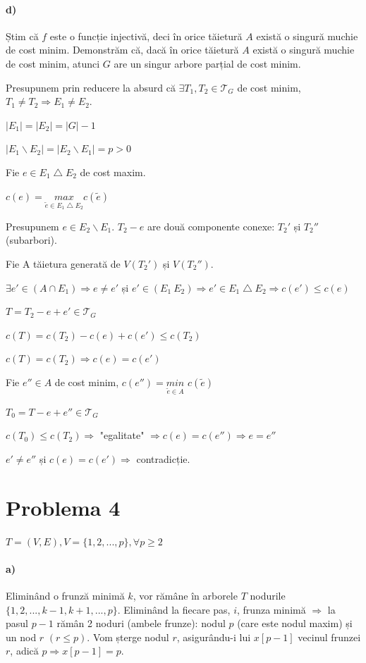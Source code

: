 \documentclass[paper=a4, fontsize=12pt]{scrartcl}
\begin{document}
\paragraph{d)}
Știm că $f$ este o funcție injectivă, deci în orice tăietură $A$ există o singură muchie de cost minim. Demonstrăm că, dacă în orice tăietură $A$
există o singură muchie de cost minim, atunci $G$ are un singur arbore parțial de cost minim.

Presupunem prin reducere la absurd că $\exists T_1, T_2 \in \mathcal{T}_G$ de cost minim, $T_1 \neq T_2 \Rightarrow E_1 \neq E_2$.

$|E_1| = |E_2| = |G|-1$

$|E_1 \backslash E_2| = |E_2 \backslash E_1| = p > 0$

\bigskip
Fie $e \in E_1 \bigtriangleup E_2$ de cost maxim. 

$c(e) = \underset{\tilde{e} \in E_1 \bigtriangleup E_2}{max} c(\tilde{e})$

Presupunem $e \in E_2 \backslash E_1$. $T_2 - e$ are două componente conexe: $T_2'$ și $T_2''$ (subarbori).

\bigskip
Fie A tăietura generată de $V(T_2')$ și $V(T_2'')$.

$\exists e' \in (A \cap E_1) \Rightarrow e \neq e'$ și $e' \in (E_1 \ E_2) \Rightarrow e' \in E_1 \bigtriangleup E_2 \Rightarrow c(e') \leq c(e)$

$T = T_2 - e + e' \in \mathcal{T}_G$

$c(T) = c(T_2) - c(e) + c(e') \leq c(T_2)$

$c(T) = c(T_2) \Rightarrow c(e) = c(e')$

\bigskip
Fie $e'' \in A$ de cost minim, $c(e'') = \underset{\tilde{e} \in A}{min}$ $c(\tilde{e})$

$T_0 = T - e + e'' \in \mathcal{T}_G$

$c(T_0) \leq c(T_2) \Rightarrow$ "egalitate" $\Rightarrow c(e) = c(e'') \Rightarrow e = e''$

\bigskip
$e' \neq e''$ și $c(e) = c(e') \Rightarrow$ contradicție.

\section*{Problema 4}
$T = (V,E), V = \{1,2,...,p\}, \forall p \geq 2$

\paragraph{a)}
Eliminând o frunză minimă $k$, vor rămâne în arborele $T$ nodurile $\{1,2,...,k-1,k+1,...,p\}$.
Eliminând la fiecare pas, $i$, frunza minimă $\Rightarrow$ la pasul $p-1$ rămân 2 noduri (ambele frunze): nodul $p$ (care este nodul maxim) și 
un nod $r$ $(r \leq p)$. Vom șterge nodul $r$, asigurându-i lui $x[p-1]$ vecinul frunzei $r$, adică $p \Rightarrow x[p-1] = p$. 
\end{document}
